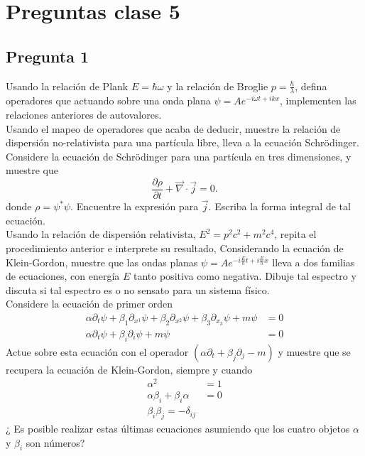 \documentclass[../main_ej.tex]{subfiles}
\begin{document}
\section{Preguntas clase 5}

\subsection{Pregunta 1}
Usando la relación de Plank  $E=\hbar \omega$ y la relación de Broglie $p=\frac{h}{\lambda}$, defina operadores que actuando sobre una onda plana $\psi=Ae^{-i\omega t+ikx}$, implementen las relaciones anteriores de autovalores. \\
Usando el mapeo de operadores que acaba de deducir, muestre la relación de dispersión no-relativista para una partícula libre, lleva a la ecuación Schrödinger. \\
Considere la ecuación de Schrödinger para una partícula en tres dimensiones, y muestre que
\begin{equation*}
  \frac{\partial \rho}{\partial t} + \vec{\nabla} \cdot \vec{j} = 0.
\end{equation*}
donde $\rho=\psi^*\psi$. Encuentre la expresión para $\vec{j}$. Escriba la forma integral de tal ecuación. \\
Usando la relación de dispersión relativista, $E^2=p^2c^2 + m^2c^4$, repita el procedimiento anterior e interprete su resultado, Considerando la ecuación de Klein-Gordon, muestre que las ondas planas $  \psi=Ae^{-i\frac{E}{h}t + i\frac{E}{h}x}$ lleva a dos familias de ecuaciones, con energía $E$ tanto positiva como negativa. Dibuje tal espectro y discuta si tal espectro es  o no sensato para un sistema físico.\\
Considere la ecuación de primer orden 
\begin{align*}
  \alpha \partial_t \psi +\beta_1 \partial_{x^1}\psi + \beta_2 \partial_{x^2}\psi + \beta_3\partial_{x_3}\psi + m\psi  & = 0 \\
  \alpha \partial_t \psi + \beta_i \partial_i\psi + m\psi & = 0
\end{align*}
Actue sobre esta ecuación con el operador $(\alpha \partial_t+\beta_j\partial_j - m)$ y muestre que se recupera la ecuación de Klein-Gordon, siempre y cuando
\begin{align*}
  \alpha^2  & = 1 \\
  \alpha \beta_i + \beta_i \alpha & = 0 \\
  \beta_i\beta_j = -\delta_{ij}
\end{align*}
¿ Es posible realizar estas últimas ecuaciones asumiendo que los cuatro objetos $\alpha$ y $\beta_i$ son números? \\
\end{document}
